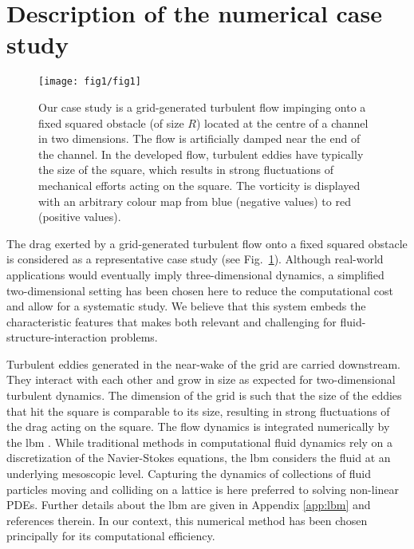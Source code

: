 \section{Description of the numerical case study}
\label{sec:test_flow}

\begin{figure}
	\centering
	\texttt{[image: fig1/fig1]}
	\caption{Our case study is a grid-generated turbulent flow impinging onto a fixed squared obstacle (of size $R$) located at the centre of a channel in two dimensions. The flow is artificially damped near the end of the channel. In the developed flow, turbulent eddies have typically the size of the square, which results in strong fluctuations of mechanical efforts acting on the square. The vorticity is displayed with an arbitrary colour map from blue (negative values) to red (positive values).}
	\label{fig:illustr_ecoulement}
\end{figure}

%
The drag exerted by a grid-generated turbulent flow onto a fixed squared obstacle is considered as a representative case study (see Fig.~\ref{fig:illustr_ecoulement}). 
%
Although real-world applications would eventually imply three-dimensional dynamics, a simplified two-dimensional setting has been chosen here to reduce the computational cost and allow for a systematic study. 
% 
We believe that this system embeds the characteristic features that makes 
 both relevant and challenging for fluid-structure-interaction problems. 

Turbulent eddies generated in the near-wake of the grid are carried downstream.
They interact with each other and grow in size as expected for two-dimensional turbulent dynamics. 
The dimension of the grid is such that the size of the eddies that hit the square is comparable to its size, resulting in strong fluctuations of the drag acting on the square. 
%
The flow dynamics is integrated numerically by the \ac{lbm} . 
While traditional methods in computational fluid dynamics rely on a discretization of the Navier-Stokes equations, the \ac{lbm} considers the fluid at an underlying  mesoscopic level.
Capturing the dynamics of collections of fluid particles moving and colliding on a lattice is here preferred to solving non-linear PDEs. 
Further details about the \ac{lbm} are given in Appendix \ref{app:lbm} and references therein.
In our context, this numerical method has been chosen principally for its computational efficiency. 


